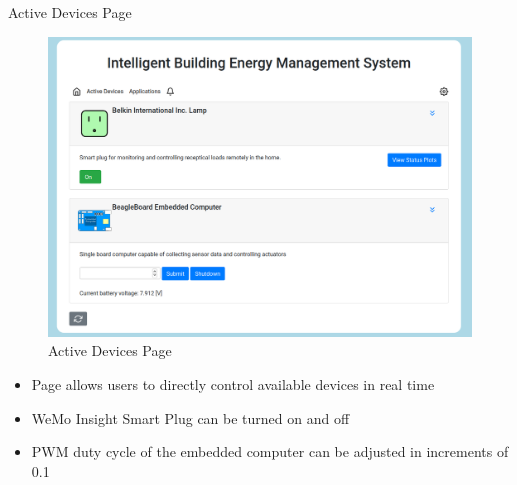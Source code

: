 \documentclass{beamer}
\begin{document}
\begin{frame}{Active Devices Page}{} %
    \begin{multicols}{2}
        \begin{figure}
            \centering
            \includegraphics[scale=0.13]{figs/ActiveDevices_screen.png}
            \caption{Active Devices Page}
            \label{fig:active_devices}
        \end{figure}
        \begin{itemize}
            \item Page allows users to directly control available devices in real time
            \item WeMo Insight Smart Plug can be turned on and off
            \item PWM duty cycle of the embedded computer can be adjusted in increments of 0.1
        \end{itemize}
    \end{multicols}
\end{frame}
\end{document}
